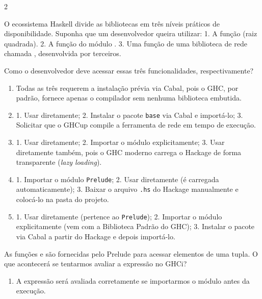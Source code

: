 \documentclass[a4paper,10pt,brazil]{article}
\begin{document}
\begin{multicols}{2}
\begin{enumerate}
\end{enumerate}

O ecossistema Haskell divide as bibliotecas em três níveis práticos de disponibilidade. Suponha que um desenvolvedor queira utilizar:
1. A função  (raiz quadrada).
2. A função  do módulo .
3. Uma função de uma biblioteca de rede chamada , desenvolvida por terceiros.

Como o desenvolvedor deve acessar essas três funcionalidades, respectivamente?

\begin{enumerate}
  \item Todas as três requerem a instalação prévia via Cabal, pois o GHC, por padrão, fornece apenas o compilador sem nenhuma biblioteca embutida.

  \item 1. Usar diretamente; 2. Instalar o pacote \texttt{base} via Cabal e importá-lo; 3. Solicitar que o GHCup compile a ferramenta de rede em tempo de execução.

  \item 1. Usar diretamente; 2. Importar o módulo explicitamente; 3. Usar diretamente também, pois o GHC moderno carrega o Hackage de forma transparente (\emph{lazy loading}).

  \item 1. Importar o módulo \texttt{Prelude}; 2. Usar diretamente (é carregada automaticamente); 3. Baixar o arquivo \texttt{.hs} do Hackage manualmente e colocá-lo na pasta do projeto.

  \item 1. Usar diretamente (pertence ao \texttt{Prelude}); 2. Importar o módulo explicitamente (vem com a Biblioteca Padrão do GHC); 3. Instalar o pacote via Cabal a partir do Hackage e depois importá-lo.


\end{enumerate}

As funções  e  são fornecidas pelo Prelude para acessar elementos de uma tupla. O que acontecerá se tentarmos avaliar a expressão  no GHCi?

\begin{enumerate}
  \item A expressão será avaliada corretamente se importarmos o módulo  antes da execução.


\end{enumerate}
\end{multicols}
\end{document}

